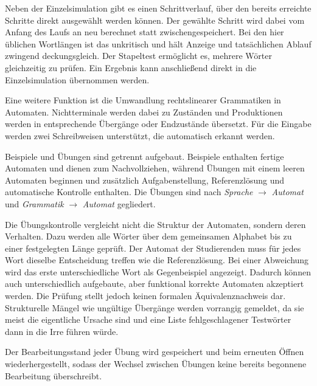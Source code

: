 
Neben der Einzelsimulation gibt es einen Schrittverlauf, über den bereits erreichte
Schritte direkt ausgewählt werden können.
Der gewählte Schritt wird dabei vom Anfang des Laufs an neu berechnet statt
zwischengespeichert. Bei den hier üblichen Wortlängen ist das unkritisch und hält
Anzeige und tatsächlichen Ablauf zwingend deckungsgleich.
Der Stapeltest ermöglicht es, mehrere Wörter gleichzeitig zu prüfen.
Ein Ergebnis kann anschließend direkt in die Einzelsimulation übernommen werden.

Eine weitere Funktion ist die Umwandlung rechtslinearer Grammatiken in Automaten.
Nichtterminale werden dabei zu Zuständen und Produktionen werden in entsprechende
Übergänge oder Endzustände übersetzt.
Für die Eingabe werden zwei Schreibweisen unterstützt, die automatisch erkannt
werden.

Beispiele und Übungen sind getrennt aufgebaut.
Beispiele enthalten fertige Automaten und dienen zum Nachvollziehen, während Übungen
mit einem leeren Automaten beginnen und zusätzlich Aufgabenstellung, Referenzlösung
und automatische Kontrolle enthalten.
Die Übungen sind nach \emph{Sprache} $\rightarrow$ \emph{Automat} und
\emph{Grammatik} $\rightarrow$ \emph{Automat} gegliedert.

Die Übungskontrolle vergleicht nicht die Struktur der Automaten, sondern deren
Verhalten.
Dazu werden alle Wörter über dem gemeinsamen Alphabet bis zu einer festgelegten Länge
geprüft.
Der Automat der Studierenden muss für jedes Wort dieselbe Entscheidung treffen wie
die Referenzlösung.
Bei einer Abweichung wird das erste unterschiedliche Wort als Gegenbeispiel
angezeigt.
Dadurch können auch unterschiedlich aufgebaute, aber funktional korrekte Automaten
akzeptiert werden.
Die Prüfung stellt jedoch keinen formalen Äquivalenznachweis dar.
Strukturelle Mängel wie ungültige Übergänge werden vorrangig gemeldet, da sie meist
die eigentliche Ursache sind und eine Liste fehlgeschlagener Testwörter dann in die
Irre führen würde.

Der Bearbeitungsstand jeder Übung wird gespeichert und beim erneuten Öffnen
wiederhergestellt, sodass der Wechsel zwischen Übungen keine bereits begonnene
Bearbeitung überschreibt.
